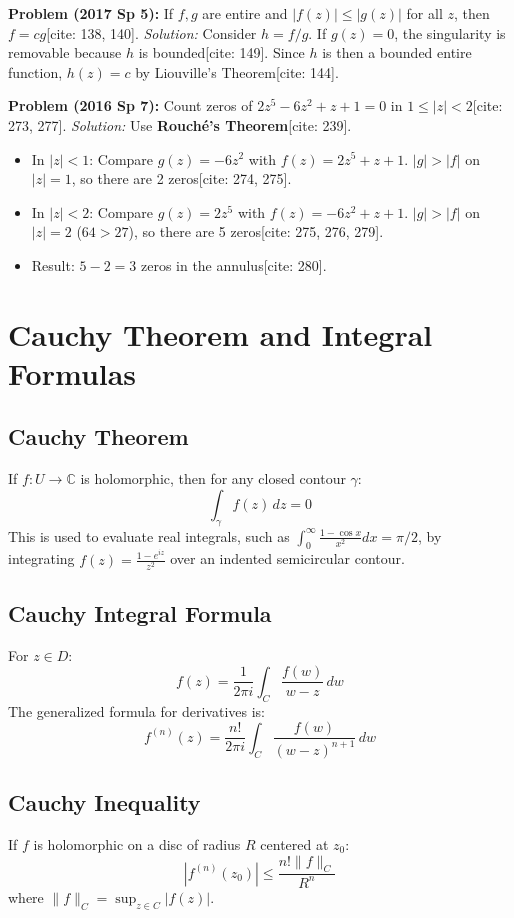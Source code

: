 \documentclass[11pt]{article}
\begin{document}
\textbf{Problem (2017 Sp 5):} If $f, g$ are entire and $|f(z)| \le |g(z)|$ for all $z$, then $f = cg$[cite: 138, 140].
\textit{Solution:} Consider $h = f/g$. If $g(z) = 0$, the singularity is removable because $h$ is bounded[cite: 149]. Since $h$ is then a bounded entire function, $h(z) = c$ by Liouville's Theorem[cite: 144].

\textbf{Problem (2016 Sp 7):} Count zeros of $2z^5 - 6z^2 + z + 1 = 0$ in $1 \le |z| < 2$[cite: 273, 277].
\textit{Solution:} Use \textbf{Rouché's Theorem}[cite: 239].
\begin{itemize}
    \item In $|z| < 1$: Compare $g(z) = -6z^2$ with $f(z) = 2z^5 + z + 1$. $|g| > |f|$ on $|z|=1$, so there are 2 zeros[cite: 274, 275].
    \item In $|z| < 2$: Compare $g(z) = 2z^5$ with $f(z) = -6z^2 + z + 1$. $|g| > |f|$ on $|z|=2$ ($64 > 27$), so there are 5 zeros[cite: 275, 276, 279].
    \item Result: $5 - 2 = 3$ zeros in the annulus[cite: 280].
\end{itemize}



\newpage
\section{Cauchy Theorem and Integral Formulas}

\subsection*{Cauchy Theorem}
If $f: U \rightarrow \mathbb{C}$ is holomorphic, then for any closed contour $\gamma$:
$$\int_{\gamma} f(z) \, dz = 0$$
This is used to evaluate real integrals, such as $\int_{0}^{\infty} \frac{1-\cos x}{x^2} dx = \pi/2$, by integrating $f(z) = \frac{1-e^{iz}}{z^2}$ over an indented semicircular contour.

\subsection*{Cauchy Integral Formula}
For $z \in D$:
$$f(z) = \frac{1}{2\pi i} \int_{C} \frac{f(w)}{w-z} \, dw$$
The generalized formula for derivatives is:
$$f^{(n)}(z) = \frac{n!}{2\pi i} \int_{C} \frac{f(w)}{(w-z)^{n+1}} \, dw$$

\subsection*{Cauchy Inequality}
If $f$ is holomorphic on a disc of radius $R$ centered at $z_0$:
$$|f^{(n)}(z_0)| \le \frac{n! \|f\|_C}{R^n}$$
where $\|f\|_C = \sup_{z \in C} |f(z)|$.
\end{document}
